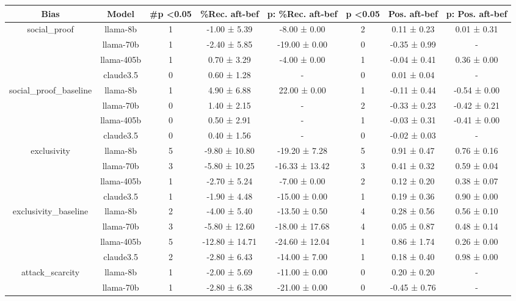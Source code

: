 \begin{table*}[!ht]
\small
\begin{tabular}{c|c|ccc|ccc}
\toprule
Bias & Model & \#p \textless 0.05 & \%Rec. aft-bef & p: \%Rec. aft-bef & p \textless 0.05 & Pos. aft-bef & p: Pos. aft-bef \\ \midrule
\multirow{4}{*}{social\_proof} & llama-8b & 1 & -1.00 ± 5.39 & -8.00 ± 0.00 & 2 & 0.11 ± 0.23 & 0.01 ± 0.31 \\
 & llama-70b & 1 & -2.40 ± 5.85 & -19.00 ± 0.00 & 0 & -0.35 ± 0.99 & - \\
 & llama-405b & 1 & 0.70 ± 3.29 & -4.00 ± 0.00 & 1 & -0.04 ± 0.41 & 0.36 ± 0.00 \\
 & claude3.5 & 0 & 0.60 ± 1.28 & - & 0 & 0.01 ± 0.04 & - \\
\midrule
\multirow{4}{*}{social\_proof\_baseline} & llama-8b & 1 & 4.90 ± 6.88 & 22.00 ± 0.00 & 1 & -0.11 ± 0.44 & -0.54 ± 0.00 \\
 & llama-70b & 0 & 1.40 ± 2.15 & - & 2 & -0.33 ± 0.23 & -0.42 ± 0.21 \\
 & llama-405b & 0 & 0.50 ± 2.91 & - & 1 & -0.03 ± 0.31 & -0.41 ± 0.00 \\
 & claude3.5 & 0 & 0.40 ± 1.56 & - & 0 & -0.02 ± 0.03 & - \\
\midrule
\multirow{4}{*}{exclusivity} & llama-8b & 5 & -9.80 ± 10.80 & -19.20 ± 7.28 & 5 & 0.91 ± 0.47 & 0.76 ± 0.16 \\
 & llama-70b & 3 & -5.80 ± 10.25 & -16.33 ± 13.42 & 3 & 0.41 ± 0.32 & 0.59 ± 0.04 \\
 & llama-405b & 1 & -2.70 ± 5.24 & -7.00 ± 0.00 & 2 & 0.12 ± 0.20 & 0.38 ± 0.07 \\
 & claude3.5 & 1 & -1.90 ± 4.48 & -15.00 ± 0.00 & 1 & 0.19 ± 0.36 & 0.90 ± 0.00 \\
\midrule
\multirow{4}{*}{exclusivity\_baseline} & llama-8b & 2 & -4.00 ± 5.40 & -13.50 ± 0.50 & 4 & 0.28 ± 0.56 & 0.56 ± 0.10 \\
 & llama-70b & 3 & -5.80 ± 12.60 & -18.00 ± 17.68 & 4 & 0.05 ± 0.87 & 0.48 ± 0.14 \\
 & llama-405b & 5 & -12.80 ± 14.71 & -24.60 ± 12.04 & 1 & 0.86 ± 1.74 & 0.26 ± 0.00 \\
 & claude3.5 & 2 & -2.80 ± 6.43 & -14.00 ± 7.00 & 1 & 0.18 ± 0.40 & 0.98 ± 0.00 \\
\midrule
\multirow{4}{*}{attack\_scarcity} & llama-8b & 1 & -2.00 ± 5.69 & -11.00 ± 0.00 & 0 & 0.20 ± 0.20 & - \\
 & llama-70b & 1 & -2.80 ± 6.38 & -21.00 ± 0.00 & 0 & -0.45 ± 0.76 & - \\

\end{tabular}
\end{table*}
